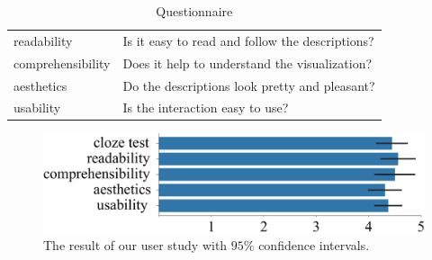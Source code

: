 \begin{table}[]
\normalsize
\caption{Questionnaire}\label{tab:questions}
\setlength{\tabcolsep}{1.8mm}
\setlength{\extrarowheight}{3pt}
    \begin{tabular}{p{2.3cm}|p{5.7cm}}
    \hline
    readability       & Is it easy to read and follow the descriptions?     \\
    comprehensibility & Does it help to understand the visualization? \\
    aesthetics        & Do the descriptions look pretty and pleasant?       \\
    usability         & Is the interaction easy to use?                   \\ \hline
\end{tabular}
\end{table}

\begin{figure}
    \centering
    \includegraphics[width=1\columnwidth]{figures/UserStudy.eps}
    \caption{The result of our user study with $95\%$ confidence intervals.}
    \label{fig:UserStudy}
\end{figure}
